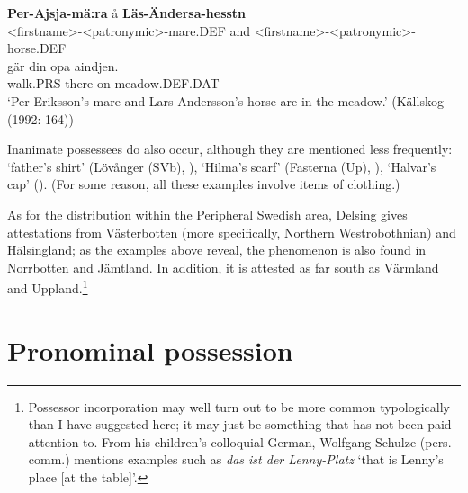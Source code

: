 

 \ea\label{}
\gll \textbf{Per-Ajsja-mä:ra} å  \textbf{Läs-Ändersa-hesstn}\\


{\textless}firstname{\textgreater}-{\textless}patronymic{\textgreater}-mare.DEF  and  {\textless}firstname{\textgreater}-{\textless}patronymic{\textgreater}-horse.DEF\\

 \ea\label{}
\gll gär  din  opa  aindjen.\\


walk.PRS  there  on  meadow.DEF.DAT\\

\glt ‘Per Eriksson’s mare and Lars Andersson’s horse are in the meadow.’ (Källskog (1992: 164))

\z

Inanimate possessees do also occur, although they are mentioned less frequently:  ‘father’s shirt’ (Lövånger (SVb), \citet{Holm1942}),  ‘Hilma’s scarf’ (Fasterna (Up), \citet[134]{Tiselius1902}),  ‘Halvar’s cap’ (\citet{Oscarsson2007}). (For some reason, all these examples involve items of clothing.)


As for the distribution within the Peripheral Swedish area, Delsing gives attestations from Västerbotten (more specifically, Northern Westrobothnian) and Hälsingland; as the examples above reveal, the phenomenon is also found in Norrbotten and Jämtland. In addition, it is attested as far south as Värmland and Uppland.\footnote{ Possessor incorporation may well turn out to be more common typologically than I have suggested here; it may just be something that has not been paid attention to. From his children’s colloquial German, Wolfgang Schulze (pers. comm.) mentions examples such as \textit{das ist der Lenny-Platz} ‘that is Lenny’s place [at the table]’.\par }


\section{Pronominal possession}

